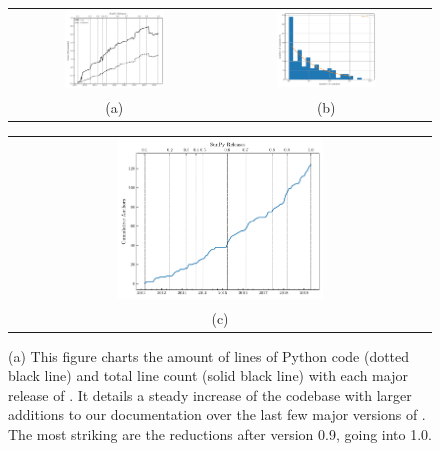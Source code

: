 \begin{figure}
\begin{tabular}{cc}
  \includegraphics[width=0.5\textwidth]{figures/fig_loc_vs_time.pdf} &
  \includegraphics[width=0.5\textwidth]{figures/busfactor_plot.pdf} \\
(a) & (b)  \\
\end{tabular}
\begin{tabular}{c}
  \includegraphics[width=0.5\textwidth]{figures/cumulative_authors.pdf} \\
(c)  \\
\end{tabular}
\caption{
	(a) This figure charts the amount of lines of Python code (dotted black line) and total line count (solid black line) with each major release of \sunpy.
	It details a steady increase of the \sunpypkg codebase with larger additions to our documentation over the last few major versions of \sunpypkg.
	The most striking are the reductions after version 0.9, going into 1.0.
}
\end{figure}
